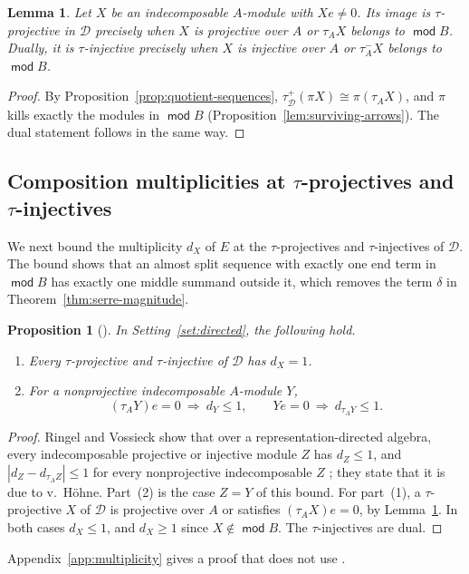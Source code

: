 \documentclass[a4paper,reqno,10pt]{amsart}
\newtheorem{proposition}[theorem]{Proposition}
\newtheorem{lemma}[theorem]{Lemma}
\theoremstyle{definition}
\numberwithin{equation}{section}
\DeclareMathOperator{\moduleCategory}{\mathsf{mod}}
\renewcommand{\mod}{\moduleCategory}
\newcommand{\cD}{\mathcal D}
\begin{document}
\begin{lemma}\label{rem:iyama-boundary}
Let \(X\) be an indecomposable \(A\)-module with \(Xe\ne0\).
Its image is \(\tau\)-projective in \(\cD\) precisely when \(X\) is
projective over \(A\) or \(\tau_A X\) belongs to \(\mod B\). Dually, it is
\(\tau\)-injective precisely when \(X\) is injective over \(A\) or
\(\tau_A^-X\) belongs to \(\mod B\).
\end{lemma}
\begin{proof}
By Proposition~\ref{prop:quotient-sequences},
\(\tau_{\cD}^+(\pi X)\cong\pi(\tau_A X)\), and \(\pi\) kills exactly the
modules in \(\mod B\) (Proposition~\ref{lem:surviving-arrows}). The dual
statement follows in the same way.
\end{proof}

\subsection{Composition multiplicities at \texorpdfstring{\(\tau\)}{tau}-projectives and \texorpdfstring{\(\tau\)}{tau}-injectives}\label{subsec:boundary}
We next bound the multiplicity \(d_X\) of \(E\) at the \(\tau\)-projectives
and \(\tau\)-injectives of \(\cD\). The bound shows that an almost split
sequence with exactly one end term in \(\mod B\) has exactly one middle
summand outside it, which removes the term \(\delta\) in
Theorem~\ref{thm:serre-magnitude}.

\begin{proposition}[{\cite[Section~10, Corollary, p.~243]{RV}}]\label{prop:boundary-one}
In Setting~\ref{set:directed}, the following hold.
\begin{enumerate}
\item Every \(\tau\)-projective and \(\tau\)-injective of \(\cD\) has
\(d_X=1\).
\item For a nonprojective indecomposable \(A\)-module \(Y\),
\begin{equation}\label{eq:zero-end}
 (\tau_A Y)e=0\ \Longrightarrow\ d_Y\leq1,\qquad
 Ye=0\ \Longrightarrow\ d_{\tau_A Y}\leq1.
\end{equation}
\end{enumerate}
\end{proposition}
\begin{proof}
Ringel and Vossieck show that over a representation-directed algebra,
every indecomposable projective or injective module \(Z\) has
\(d_Z\leq1\), and \(|d_Z-d_{\tau_A Z}|\leq1\) for every nonprojective
indecomposable \(Z\) \cite[Section~10, Corollary, p.~243]{RV}; they
state that it is due to v.~H\"ohne. Part~(2) is the case \(Z=Y\) of this bound.
For part~(1), a \(\tau\)-projective \(X\) of \(\cD\) is projective over
\(A\) or satisfies \((\tau_A X)e=0\), by Lemma~\ref{rem:iyama-boundary}. In
both cases \(d_X\leq1\), and \(d_X\geq1\) since \(X\notin\mod B\). The
\(\tau\)-injectives are dual.
\end{proof}
Appendix~\ref{app:multiplicity} gives a proof that does not use \cite{RV}.
\end{document}
